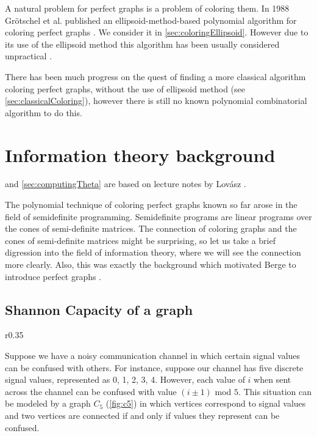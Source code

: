A natural problem for perfect graphs is a problem of coloring them. In 1988 Gr\"otschel et al. published an ellipsoid-method-based polynomial algorithm for coloring perfect graphs \cite{Grtschel1993}. We consider it in \cref{sec:coloringEllipsoid}. However due to its use of the ellipsoid method this algorithm has been usually considered unpractical \cite{coloringSquareFree,Chudnovsky2003, coloringArtemis}.

There has been much progress on the quest of finding a more classical algorithm coloring perfect graphs, without the use of ellipsoid method (see \cref{sec:classicalColoring}), however there is still no known polynomial combinatorial algorithm to do this. 

\section{Information theory background}
\label{sec:InformationTheory}

 and \cref{sec:computingTheta} are based on lecture notes by Lovász \cite{Lovasz95}.

The polynomial technique of coloring perfect graphs known so far arose in the field of semidefinite programming. Semidefinite programs are linear programs over the cones of semi-definite matrices. The connection of coloring graphs and the cones of semi-definite matrices might be surprising, so let us take a brief digression into the field of information theory, where we will see the connection more clearly. Also, this was exactly the background which motivated Berge to introduce perfect graphs \cite{Chudnovsky2003}.

\subsection{Shannon Capacity of a graph}
\label{sec:ShannonCapacity}

\begin{wrapfigure}{r}{0.35\textwidth}
  
  \caption{An example of a noisy channel}%
  \label{fig:c5}
\end{wrapfigure}

Suppose we have a noisy communication channel in which certain signal values can be confused with others. For instance, suppose our channel has five discrete signal values, represented as 0, 1, 2, 3, 4. However, each value of $i$ when sent across the channel can be confused with value $(i \pm 1)$ mod $5$. This situation can be modeled by a graph $C_5$ (\cref{fig:c5}) in which vertices correspond to signal values and two vertices are connected if and only if values they represent can be confused.


